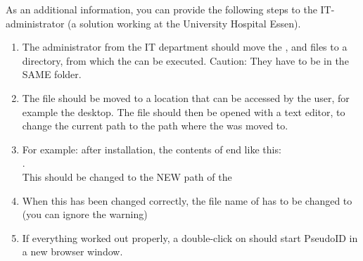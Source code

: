 As an additional information, you can provide the following steps to the IT-administrator (a solution working at the University Hospital Essen).

\begin{enumerate}
    
    \item The administrator from the IT department should move the ,  and   files to a directory, from which the  can be executed. Caution: They have to be in the SAME folder. 
    
    \item The  file should be moved to a location that can be accessed by the user, for example the desktop. The file should then be opened with a text editor, to change the current path to the path where the  was moved to.
    \label{item:admin}
    
    \item For example: after installation, the contents of  end like this: \\ . \\ This should be changed to the NEW path of the 
    
    \item When this has been changed correctly, the file name of  has to be changed to  (you can ignore the warning)
    
    \item If everything worked out properly, a double-click on  should start PseudoID in a new browser window.
\end{enumerate} 


